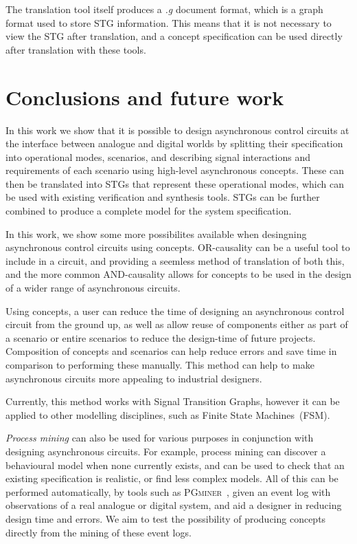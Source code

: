 \documentclass[british,conference,compsoc]{IEEEtran}
\newcommand{\noun}[1]{\textsc{#1}}
\begin{document}
The translation tool itself produces a \emph{.g} document format, which is a
graph format used to store STG information. This means that it is not
necessary to view the STG after translation, and a concept specification
can be used directly after translation with these tools. 


\section{Conclusions and future work\label{sec:conclusions}}

In this work we show that it is possible to design asynchronous control
circuits at the interface between analogue and digital worlds by
splitting their specification into operational modes, scenarios, and
describing signal interactions and requirements of each scenario using
high-level asynchronous concepts. These can then be translated into STGs
that represent these operational modes, which can be used with existing
verification and synthesis tools. STGs can be further combined to
produce a complete model for the system specification.

In this work, we show some more possibilites available when desingning
asynchronous control circuits using concepts. OR-causality can be a
useful tool to include in a circuit, and providing a seemless method
of translation of both this, and the more common AND-causality allows
for concepts to be used in the design of a wider range of asynchronous 
circuits.

Using concepts, a user can reduce the time of designing an asynchronous
control circuit from the ground up, as well as allow reuse of components
either as part of a scenario or entire scenarios to reduce the design-time
of future projects. Composition of concepts and scenarios can help
reduce errors and save time in comparison to performing these manually.
This method can help to make asynchronous circuits more appealing
to industrial designers.

Currently, this method works with Signal Transition Graphs, however
it can be applied to other modelling disciplines, such as Finite State
Machines~(FSM).

\emph{Process mining} can also be used for various purposes in conjunction
with designing asynchronous circuits. For example, process mining can discover
a behavioural model when none currently exists, and can be used to check 
that an existing specification is realistic, or find less complex models. 
All of this can be performed automatically, by tools such as
\noun{PGminer}~\cite{mokhov2016mining}, given
an event log with observations of a real analogue or digital system, and aid a
designer in reducing design time and errors. We aim to test the possibility of 
producing concepts directly from the mining of these event logs.
\end{document}
